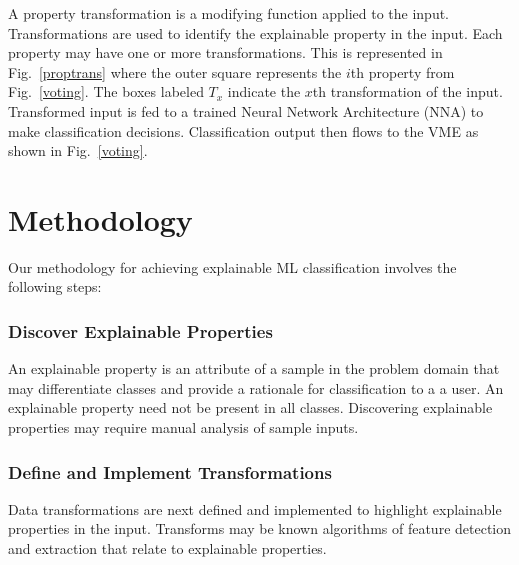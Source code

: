 \documentclass[conference]{IEEEtran}
\begin{document}
A property transformation is a modifying function applied to the input.  Transformations are used to identify the explainable property in the input.  Each property may have one or more transformations.   This is represented in Fig.~\ref{proptrans} where the outer square represents the $i$th property from Fig.~\ref{voting}.  The boxes labeled $T_x$ indicate the $x$th transformation of the input.  Transformed input is fed to a trained Neural Network Architecture (NNA) to make classification decisions.  Classification output then flows to the VME as shown in Fig.~\ref{voting}.

\section{Methodology}
 
Our methodology for achieving explainable ML classification involves the following steps:

\subsubsection{Discover Explainable Properties}
An explainable property is an attribute of a sample in the problem domain that may differentiate classes and provide a rationale for classification to a a user.   An explainable property need not be present in all classes.  Discovering explainable properties may require manual analysis of sample inputs.

\subsubsection{Define and Implement Transformations}
Data transformations are next defined and implemented to highlight explainable properties in the input.  Transforms may be known algorithms of feature detection and extraction that relate to explainable properties.
\end{document}
